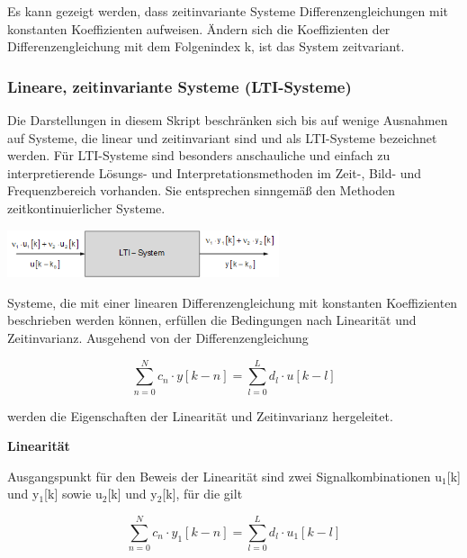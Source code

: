 \noindent Es kann gezeigt werden, dass zeitinvariante Systeme Differenzengleichungen mit konstanten Koeffizienten aufweisen. \"{A}ndern sich die Koeffizienten der Differenzengleichung mit dem Folgenindex k, ist das System zeitvariant. 

\subsubsection{Lineare, zeitinvariante Systeme (LTI-Systeme)}\label{fourtwothree}

\noindent Die Darstellungen in diesem Skript beschr\"{a}nken sich bis auf wenige Ausnahmen auf Systeme, die linear und zeitinvariant sind und als LTI-Systeme bezeichnet werden. F\"{u}r LTI-Systeme sind besonders anschauliche und einfach zu interpretierende L\"{o}sungs- und Interpretationsmethoden im Zeit-, Bild- und Frequenzbereich vorhanden. Sie entsprechen sinngem\"{a}{\ss} den Methoden zeitkontinuierlicher Systeme.\medskip


\centerline{\includegraphics[width=0.6\textwidth]{Kapitel4/Bilder/image3.11.png}}
{}\bigskip

\noindent Systeme, die mit einer linearen Differenzengleichung mit konstanten Koeffizienten beschrieben werden k\"{o}nnen, erf\"{u}llen die Bedingungen nach Linearit\"{a}t und Zeitinvarianz. Ausgehend von der Differenzengleichung

\begin{equation}\label{eq:fourtwentyeight}
\sum _{n=0}^{N}c_{n} \cdot y\left[k-n\right] =\sum _{l=0}^{L}d_{l} \cdot u\left[k-l\right] 
\end{equation}

\noindent werden die Eigenschaften der Linearit\"{a}t und Zeitinvarianz hergeleitet.\bigskip

{\selectfont
\noindent\textbf{Linearität}} \smallskip

\noindent Ausgangspunkt f\"{u}r den Beweis der Linearit\"{a}t sind zwei Signalkombinationen u${}_{1}$[k] und y${}_{1}$[k] sowie u${}_{2}$[k] und y${}_{2}$[k], f\"{u}r die gilt

\begin{equation}\label{eq:fourtwentynine}
\sum _{n=0}^{N}c_{n} \cdot y_{1} \left[k-n\right] =\sum _{l=0}^{L}d_{l} \cdot u_{1} \left[k-l\right]
\end{equation}

